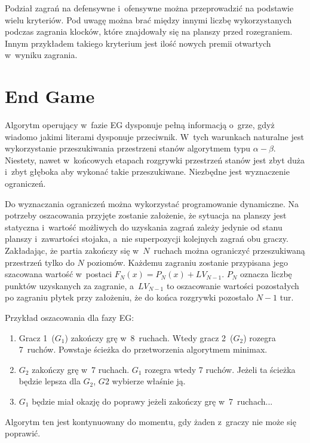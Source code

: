 \documentclass[a4paper,twocolumn,12pt]{article}
\theoremstyle{definition}
\begin{document}
Podział zagrań na defensywne i~ofensywne można przeprowadzić na podstawie wielu kryteriów. Pod uwagę można brać między innymi liczbę wykorzystanych podczas zagrania klocków, które znajdowały się na planszy przed rozegraniem. Innym przykładem takiego kryterium jest ilość nowych premii otwartych w~wyniku zagrania.

\section*{End Game}

Algorytm operujący w~fazie EG dysponuje pełną informacją o~grze, gdyż wiadomo jakimi literami dysponuje przeciwnik. W~tych warunkach naturalne jest wykorzystanie przeszukiwania przestrzeni stanów algorytmem typu $\alpha - \beta$. Niestety, nawet w~końcowych etapach rozgrywki przestrzeń stanów jest zbyt duża i~zbyt głęboka aby wykonać takie przeszukiwane. Niezbędne jest wyznaczenie ograniczeń.

Do wyznaczania ograniczeń można wykorzystać programowanie dynamiczne. Na potrzeby oszacowania przyjęte zostanie założenie, że sytuacja na planszy jest statyczna i~wartość możliwych do uzyskania zagrań zależy jedynie od stanu planszy i~zawartości stojaka, a~nie superpozycji kolejnych zagrań obu graczy. Zakładając, że partia zakończy się w~$N$~ruchach można ograniczyć przeszukiwaną przestrzeń tylko do $N$ poziomów. Każdemu zagraniu zostanie przypisana jego szacowana wartość w~postaci $F_{N}(x) = P_{N}(x) + LV_{N-1}$. $P_{N}$ oznacza liczbę punktów uzyskanych za zagranie, a~$LV_{N-1}$ to oszacowanie wartości pozostałych po zagraniu płytek przy założeniu, że do końca rozgrywki pozostało $N - 1$ tur.

Przykład oszacowania dla fazy EG:

\begin{enumerate}
	\item Gracz 1~($G_{1}$) zakończy grę w~8~ruchach. Wtedy gracz 2~($G_{2}$) rozegra 7~ruchów. Powstaje ścieżka do przetworzenia algorytmem minimax.
	\item $G_{2}$ zakończy grę w~7 ruchach. $G_{1}$ rozegra wtedy 7 ruchów. Jeżeli ta ścieżka będzie lepsza dla $G_{2}$, $G{2}$ wybierze właśnie ją.
	\item $G_{1}$ będzie miał okazję do poprawy jeżeli zakończy grę w~7~ruchach...
\end{enumerate}

Algorytm ten jest kontynuowany do momentu, gdy żaden z~graczy nie może się poprawić.
\end{document}
